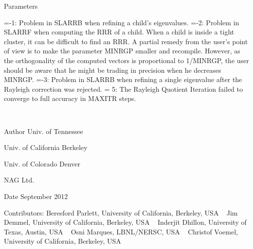 \begin{DoxyParams}[1]{Parameters}
\begin{DoxyVerb}
          =-1:  Problem in SLARRB when refining a child's eigenvalues.
          =-2:  Problem in SLARRF when computing the RRR of a child.
                When a child is inside a tight cluster, it can be difficult
                to find an RRR. A partial remedy from the user's point of
                view is to make the parameter MINRGP smaller and recompile.
                However, as the orthogonality of the computed vectors is
                proportional to 1/MINRGP, the user should be aware that
                he might be trading in precision when he decreases MINRGP.
          =-3:  Problem in SLARRB when refining a single eigenvalue
                after the Rayleigh correction was rejected.
          = 5:  The Rayleigh Quotient Iteration failed to converge to
                full accuracy in MAXITR steps.\end{DoxyVerb}
 \\
\hline
\end{DoxyParams}
\begin{DoxyAuthor}{Author}
Univ. of Tennessee 

Univ. of California Berkeley 

Univ. of Colorado Denver 

N\+A\+G Ltd. 
\end{DoxyAuthor}
\begin{DoxyDate}{Date}
September 2012 
\end{DoxyDate}
\begin{DoxyParagraph}{Contributors\+: }
Beresford Parlett, University of California, Berkeley, U\+S\+A ~\newline
 Jim Demmel, University of California, Berkeley, U\+S\+A ~\newline
 Inderjit Dhillon, University of Texas, Austin, U\+S\+A ~\newline
 Osni Marques, L\+B\+N\+L/\+N\+E\+R\+S\+C, U\+S\+A ~\newline
 Christof Voemel, University of California, Berkeley, U\+S\+A 
\end{DoxyParagraph}

